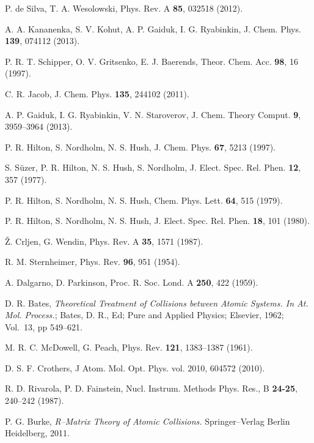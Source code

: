 \begin{thebibliography}{9}
P. de Silva, T. A. Wesolowski,
Phys. Rev. A \textbf{85}, 032518 (2012).

A. A. Kananenka, S. V. Kohut, A. P. Gaiduk, I. G. Ryabinkin, 
J. Chem. Phys. \textbf{139}, 074112 (2013).

P. R. T. Schipper, O. V. Gritsenko, E. J. Baerends,
Theor. Chem. Acc. \textbf{98}, 16 (1997).

C. R. Jacob,
J. Chem. Phys. \textbf{135}, 244102 (2011).

A. P. Gaiduk, I. G. Ryabinkin, V. N. Staroverov, 
J. Chem. Theory Comput. \textbf{9}, 3959--3964 (2013).

P. R. Hilton, S. Nordholm, N. S. Hush, 
J. Chem. Phys. \textbf{67}, 5213 (1997).

S. S{\"u}zer, P. R. Hilton, N. S. Hush, S. Nordholm,
J. Elect. Spec. Rel. Phen. \textbf{12}, 357 (1977).

P. R. Hilton, S. Nordholm, N. S. Hush,
Chem. Phys. Lett. \textbf{64}, 515 (1979).

P. R. Hilton, S. Nordholm, N. S. Hush, 
J. Elect. Spec. Rel. Phen. \textbf{18}, 101 (1980).

{\v Z}. Crljen, G. Wendin,
Phys. Rev. A \textbf{35}, 1571 (1987).

R. M. Sternheimer, 
Phys. Rev. \textbf{96}, 951 (1954).

A. Dalgarno, D. Parkinson,
Proc. R. Soc. Lond. A \textbf{250}, 422 (1959).

D. R. Bates, 
\textit{Theoretical Treatment of Collisions between Atomic Systems.
In At. Mol. Process.};
Bates, D. R., Ed;
Pure and Applied Physics;
Elsevier, 1962;
Vol.~13, pp 549--621.

M. R. C. McDowell, G. Peach, 
Phys. Rev. \textbf{121}, 1383--1387 (1961).

D. S. F. Crothers,
J Atom. Mol. Opt. Phys. vol. 2010, 604572 (2010).

R. D. Rivarola, P. D. Fainstein,
Nucl. Instrum. Methods Phys. Res., B \textbf{24-25}, 240--242 (1987).

P. G. Burke, 
\textit{R--Matrix Theory of Atomic Collisions.}
Springer--Verlag Berlin Heidelberg, 2011.


\end{thebibliography}
